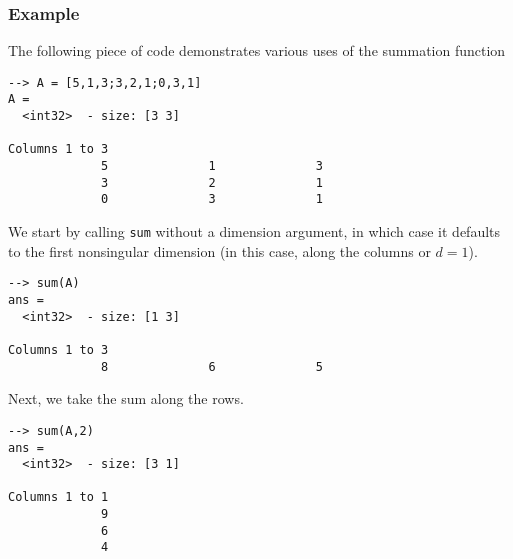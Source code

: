 \subsubsection{Example}
The following piece of code demonstrates various uses of the summation
function
\begin{verbatim}
--> A = [5,1,3;3,2,1;0,3,1]
A =
  <int32>  - size: [3 3]
  
Columns 1 to 3
             5              1              3
             3              2              1
             0              3              1
\end{verbatim}
We start by calling \verb|sum| without a dimension argument, in which case it defaults to the first nonsingular dimension (in this case, along the columns or $d = 1$).
\begin{verbatim}
--> sum(A)
ans =
  <int32>  - size: [1 3]
  
Columns 1 to 3
             8              6              5
\end{verbatim}
Next, we take the sum along the rows.
\begin{verbatim}
--> sum(A,2)
ans =
  <int32>  - size: [3 1]
  
Columns 1 to 1
             9
             6
             4
\end{verbatim}

